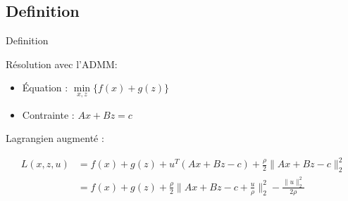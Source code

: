 \subsection{Definition}

\frame{
    \tableofcontents[ 
        currentsubsection, 
    ]
}


\begin{frame}{Definition}

Résolution avec l'ADMM:
\begin{itemize}
    \item Équation : $\min\limits_{x, z} \{ f(x) + g(z) \}$
    \item Contrainte : $Ax + Bz = c$
\end{itemize}

\vspace{5mm}

Lagrangien augmenté :

\begin{align*}
L(x, z, u) 
&= f(x) + g(z) + u^{T}(Ax + Bz - c) 
+ \frac{\rho}{2} \lVert Ax + Bz - c \rVert_{2}^{2} \\
&= f(x) + g(z)
+ \frac{\rho}{2} \lVert Ax + Bz - c + \frac{u}{\rho} \rVert_{2}^{2}
- \frac{\lVert u \rVert_{2}^{2}}{2\rho} \\
\end{align*}

\end{frame}









